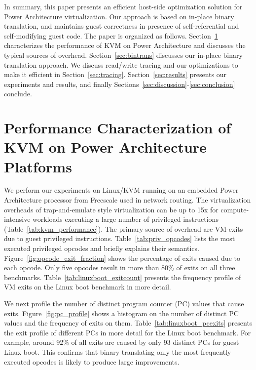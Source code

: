 \documentclass[10pt,twocolumn]{article}
\begin{document}
In summary, this paper presents an efficient host-side optimization solution for
Power Architecture virtualization. Our approach is based on in-place binary translation,
and maintains guest correctness in presence of self-referential and self-modifying
guest code.
The paper is organized as
follows. Section~\ref{sec:performance_char} characterizes the performance of
KVM on Power Architecture and discusses the typical sources of overhead.
Section~\ref{sec:bintrans} discusses our in-place binary translation approach.
We discuss read/write tracing and our optimizations to make
it efficient in Section~\ref{sec:tracing}.
Section~\ref{sec:results} presents our experiments and results, and
finally Sections~\ref{sec:discussion}-\ref{sec:conclusion} conclude.

\section{Performance Characterization of KVM on Power Architecture Platforms}
\label{sec:performance_char}
We perform our experiments on Linux/KVM running on an
embedded Power Architecture processor from Freescale used in network
routing.
The virtualization overheads
of trap-and-emulate style virtualization can be up to 15x for compute-intensive
workloads executing a large number of privileged
instructions (Table~\ref{tab:kvm_performance}). The primary source of
overhead are VM-exits due to guest privileged instructions.
Table~\ref{tab:priv_opcodes} lists the most executed privileged
opcodes and briefly explains their semantics.
Figure~\ref{fig:opcode_exit_fraction} shows the percentage of exits caused
due to each opcode. Only five opcodes result in more than 80\% of exits on all
three benchmarks. Table~\ref{tab:linuxboot_exitcount} presents the frequency
profile of VM exits on the Linux boot benchmark in more detail.

We next profile the number of distinct program counter (PC) values that
cause exits. Figure~\ref{fig:pc_profile} shows a histogram on the number
of distinct PC values and the frequency of exits on them.
Table~\ref{tab:linuxboot_pcexits} presents the exit profile of different
PCs in more detail for the Linux boot benchmark. For example, around 92\% of all
exits are caused by only 93 distinct PCs for guest Linux boot. This confirms that
binary translating
only the most frequently executed opcodes is likely to produce large improvements.
\end{document}

